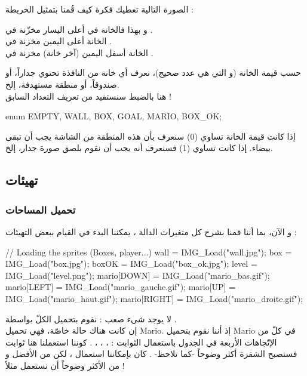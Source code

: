 الصورة التالية تعطيك فكرة كيف قُمنا بتمثيل الخريطة  :


و بهذا فالخانة في أعلى اليسار مخزّنة في
.\\
الخانة أعلى اليمين مخزنة في
.\\
الخانة أسفل اليمين (آخر خانة) مخزنة في
.

حسب قيمة الخانة (و التي هي عدد صحيح)، نعرف أي خانة من النافذة تحتوي جداراً، أو صندوقاً، أو منطقة مستهدفة، إلخ.\\
هنا بالضبط سنستفيد من تعريف التعداد السابق !

\begin{Csource}
enum {EMPTY, WALL, BOX, GOAL, MARIO, BOX_OK};
\end{Csource}

إذا كانت قيمة الخانة تساوي
 (0)
سنعرف بأن هذه المنطقة من الشاشة يجب أن تبقى بيضاء. إذا كانت تساوي
 (1)
فسنعرف أنه يجب أن نقوم بلصق صورة جدار، إلخ.

\subsection{تهيئات}

\subsubsection{تحميل المساحات}

و الآن، بما أننا قمنا بشرح كل متغيرات الدالة
،
يمكننا البدء في القيام ببعض التهيئات :

\begin{Csource}
// Loading the sprites (Boxes, player...)
wall = IMG_Load("wall.jpg");
box = IMG_Load("box.jpg");
boxOK = IMG_Load("box_ok.jpg");
level = IMG_Load("level.png");
mario[DOWN] = IMG_Load("mario_bas.gif");
mario[LEFT] = IMG_Load("mario_gauche.gif");
mario[UP] = IMG_Load("mario_haut.gif");
mario[RIGHT] = IMG_Load("mario_droite.gif");
\end{Csource}

لا يوجد شيء صعب : نقوم بتحميل الكلّ بواسطة 
.\\
إن كانت هناك حالة خاصّة، فهي تحميل
\textenglish{Mario}.
 إذ أننا نقوم بتحميل 
\textenglish{Mario}
 في كلّ من الإتّجاهات الأربعة في الجدول
باستعمال الثوابت : 
، ، ، .
كوننا استعملنا هنا ثوابت فستصبح الشفرة أكثر وضوحاً -كما تلاحظ- . كان بإمكاننا استعمال
،
لكن من الأفضل و من الأكثر وضوحاً أن نستعمل
مثلاً !

